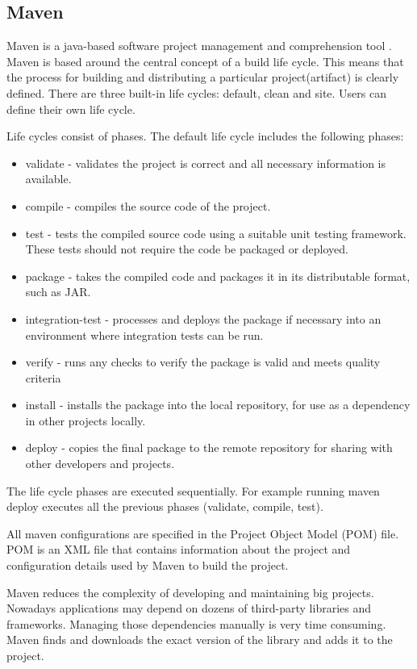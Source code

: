   \subsection{Maven}
  Maven is a java-based software project management and comprehension tool
  \cite{maven}.
  Maven is based around the central concept of a build life cycle. This means
  that the process for building and distributing a particular project(artifact) is clearly defined.
   There are three built-in life cycles:
  default, clean and site. Users can define their own life cycle. 
  
  Life cycles  consist of phases.  The default life cycle includes the following phases:
  \begin{itemize}
    \item validate - validates the project is correct and all necessary
    information is available.
    \item compile - compiles the source code of the project.
    \item test - tests the compiled source code using a suitable unit testing
    framework. These tests should not require the code be packaged or deployed.
    \item package - takes the compiled code and packages it in its distributable
    format, such as JAR.
    \item integration-test - processes and deploys the package if necessary into
    an environment where integration tests can be run.
    \item verify - runs any checks to verify the package is valid and meets quality criteria
    \item install - installs the package into the local repository, for use as a
      dependency in other projects locally.
    \item  deploy - copies the final package to the remote repository for
    sharing with other developers and projects.
  \end{itemize}
  
  The life cycle phases are executed sequentially. For  example 
  running maven deploy executes all the  previous phases (validate, compile,
  test).
  
  All maven configurations are specified in the Project Object Model (POM) file.
  POM is an XML file that contains information about the project and configuration
   details used by Maven to build the project. 

  Maven reduces the complexity of developing and maintaining big projects.
  Nowadays applications may depend on dozens of third-party libraries and
  frameworks. Managing those dependencies manually is very time consuming. Maven
  finds  and downloads the exact version of the library and adds it to the
  project.
  

